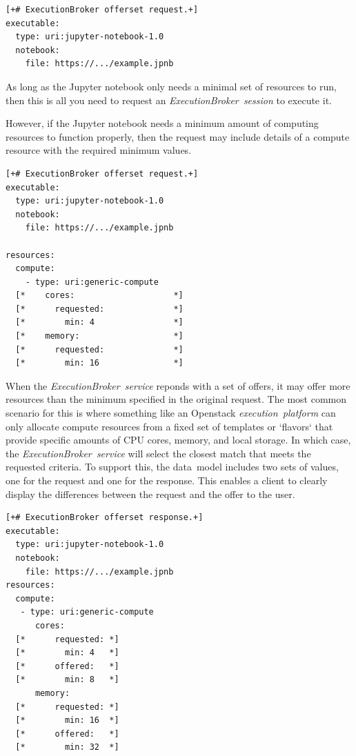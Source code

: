 \documentclass[11pt,a4paper]{ivoa}
\newcommand{\datamodel} {data~model}
\newcommand{\execbrokerservice}[1] {\textit{ExecutionBroker~service#1}}
\newcommand{\execsession}[1] {\textit{ExecutionBroker~session#1}}
\newcommand{\execplatform} {\textit{execution~platform}}
\newcommand{\jupyternotebook} {Jupyter notebook}
\newcommand{\openstack} {Openstack}
\newcommand{\cpu}[1] {CPU#1}
\begin{document}
\begin{lstlisting}[]
[+# ExecutionBroker offerset request.+]
executable:
  type: uri:jupyter-notebook-1.0
  notebook:
    file: https://.../example.jpnb
\end{lstlisting}

As long as the \jupyternotebook{} only needs a minimal set of resources to run,
then this is all you need to request an \execsession{} to execute it.

However, if the \jupyternotebook{} needs a minimum amount of computing resources
to function properly, then the request may include details of a compute resource
with the required minimum values.

\begin{lstlisting}[]
[+# ExecutionBroker offerset request.+]
executable:
  type: uri:jupyter-notebook-1.0
  notebook:
    file: https://.../example.jpnb

resources:
  compute:
    - type: uri:generic-compute
  [*    cores:                    *]
  [*      requested:              *]
  [*        min: 4                *]
  [*    memory:                   *]
  [*      requested:              *]
  [*        min: 16               *]
\end{lstlisting}

When the \execbrokerservice{} reponds with a set of offers, it may offer more
resources than the minimum specified in the original request.
The most common scenario for this is where something like an \openstack{}
\execplatform{} can only allocate compute resources from a fixed set of templates
or `flavors` that provide specific amounts of \cpu{} cores, memory, and local storage.
In which case, the \execbrokerservice{} will select the closest match that meets
the requested criteria.
To support this, the \datamodel{} includes two sets of values, one for the request
and one for the response. This enables a client to clearly display the differences
between the request and the offer to the user.

\begin{lstlisting}[]
[+# ExecutionBroker offerset response.+]
executable:
  type: uri:jupyter-notebook-1.0
  notebook:
    file: https://.../example.jpnb
resources:
  compute:
   - type: uri:generic-compute
      cores:
  [*      requested: *]
  [*        min: 4   *]
  [*      offered:   *]
  [*        min: 8   *]
      memory:
  [*      requested: *]
  [*        min: 16  *]
  [*      offered:   *]
  [*        min: 32  *]
\end{lstlisting}
\end{document}
